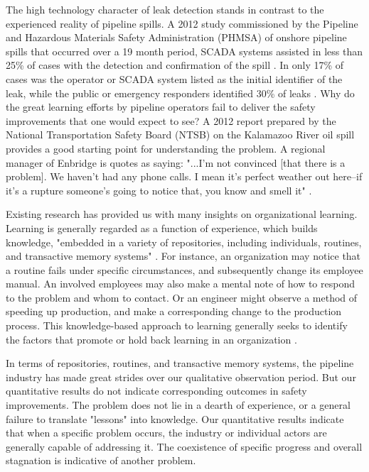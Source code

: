 \documentclass[12pt, man, natbib]{apa6}
\begin{document}
	The high technology character of leak detection stands in contrast to the experienced reality of pipeline spills. A 2012 study commissioned by the Pipeline and Hazardous Materials Safety Administration (PHMSA) of onshore pipeline spills that occurred over a 19 month period, SCADA systems assisted in less than 25\% of cases with the detection and confirmation of the spill \citep[p. 3-33]{Shaw2012}. In only 17\% of cases was the operator or SCADA system listed as the initial identifier of the leak, while the public or emergency responders identified 30\% of leaks \citep[p. 3-39]{Shaw2012}. Why do the great learning efforts by pipeline operators fail to deliver the safety improvements that one would expect to see? A 2012 report prepared by the National Transportation Safety Board (NTSB) on the Kalamazoo River oil spill provides a good starting point for understanding the problem. A regional manager of Enbridge is quotes as saying: "...I'm not convinced [that there is a problem]. We haven't had any phone calls. I mean it's perfect weather out here--if it's a rupture someone's going to notice that, you know and smell it" \citep[p. 100]{NTSB2012}.
	
	Existing research has provided us with many insights on organizational learning. Learning is generally regarded as a function of experience, which builds knowledge, "embedded in a variety of repositories, including individuals, routines, and transactive memory systems" \citep[p. 1124]{Argote2011}. For instance, an organization may notice that a routine fails under specific circumstances, and subsequently change its employee manual. An involved employees may also make a mental note of how to respond to the problem and whom to contact. Or an engineer might observe a method of speeding up production, and make a corresponding change to the production process. This knowledge-based approach to learning generally seeks to identify the factors that promote or hold back learning in an organization \citep[e.g.,][p. 2]{Argote2013-1}.
	
	In terms of repositories, routines, and transactive memory systems, the pipeline industry has made great strides over our qualitative observation period. But our quantitative results do not indicate corresponding outcomes in safety improvements. The problem does not lie in a dearth of experience, or a general failure to translate "lessons" into knowledge. Our quantitative results indicate that when a specific problem occurs, the industry or individual actors are generally capable of addressing it. The coexistence of specific progress and overall stagnation is indicative of another problem.
	
\end{document}
